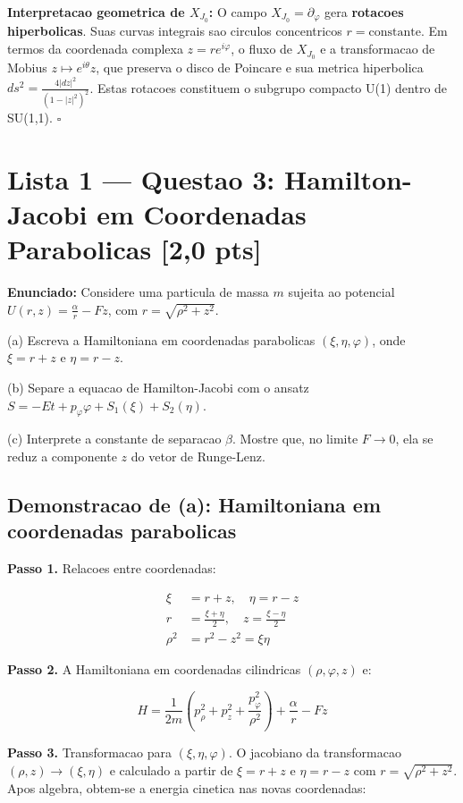 \documentclass[12pt,a4paper,oneside]{article}
\begin{document}
\textbf{Interpretacao geometrica de $X_{J_0}$:} O campo $X_{J_0} = \partial_\varphi$
gera \textbf{rotacoes hiperbolicas}. Suas curvas integrais sao circulos
concentricos $r = \text{constante}$. Em termos da coordenada complexa $z = re^{i\varphi}$,
o fluxo de $X_{J_0}$ e a transformacao de Mobius $z \mapsto e^{i\theta}z$, que
preserva o disco de Poincare e sua metrica hiperbolica $ds^2 = \frac{4|dz|^2}{(1-|z|^2)^2}$.
Estas rotacoes constituem o subgrupo compacto U(1) dentro de SU(1,1). $\square$

\newpage
\section{Lista 1 — Questao 3: Hamilton-Jacobi em Coordenadas Parabolicas [2,0 pts]}

\textbf{Enunciado:} Considere uma particula de massa $m$ sujeita ao potencial
$U(r,z) = \frac{\alpha}{r} - Fz$, com $r = \sqrt{\rho^2 + z^2}$.

(a) Escreva a Hamiltoniana em coordenadas parabolicas $(\xi,\eta,\varphi)$,
onde $\xi = r+z$ e $\eta = r-z$.

(b) Separe a equacao de Hamilton-Jacobi com o ansatz $S = -Et + p_\varphi\varphi
+ S_1(\xi) + S_2(\eta)$.

(c) Interprete a constante de separacao $\beta$. Mostre que, no limite
$F \to 0$, ela se reduz a componente $z$ do vetor de Runge-Lenz.

\subsection*{Demonstracao de (a): Hamiltoniana em coordenadas parabolicas}

\textbf{Passo 1.} Relacoes entre coordenadas:

\begin{align*}
\xi &= r+z, \quad \eta = r-z \\
r &= \frac{\xi+\eta}{2}, \quad z = \frac{\xi-\eta}{2} \\
\rho^2 &= r^2 - z^2 = \xi\eta
\end{align*}

\textbf{Passo 2.} A Hamiltoniana em coordenadas cilindricas $(\rho,\varphi,z)$ e:

$$H = \frac{1}{2m}\left(p_\rho^2 + p_z^2 + \frac{p_\varphi^2}{\rho^2}\right) +
\frac{\alpha}{r} - Fz$$

\textbf{Passo 3.} Transformacao para $(\xi,\eta,\varphi)$. O jacobiano da
transformacao $(\rho,z) \to (\xi,\eta)$ e calculado a partir de
$\xi = r+z$ e $\eta = r-z$ com $r = \sqrt{\rho^2+z^2}$. Apos algebra,
obtem-se a energia cinetica nas novas coordenadas:
\end{document}
